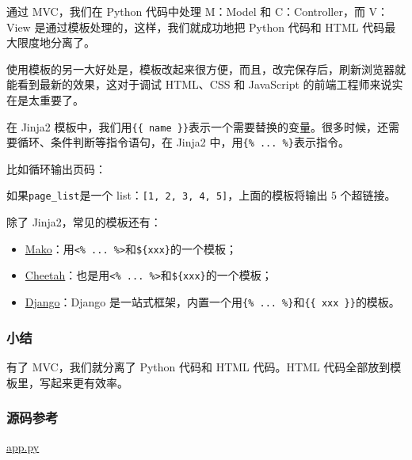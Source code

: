 通过 MVC，我们在 Python 代码中处理 M：Model 和 C：Controller，而 V：View
是通过模板处理的，这样，我们就成功地把 Python 代码和 HTML
代码最大限度地分离了。

使用模板的另一大好处是，模板改起来很方便，而且，改完保存后，刷新浏览器就能看到最新的效果，这对于调试
HTML、CSS 和 JavaScript 的前端工程师来说实在是太重要了。

在 Jinja2
模板中，我们用\texttt{\{\{\ name\ \}\}}表示一个需要替换的变量。很多时候，还需要循环、条件判断等指令语句，在
Jinja2 中，用\texttt{\{\%\ ...\ \%\}}表示指令。

比如循环输出页码：


如果\texttt{page\_list}是一个
list：\texttt{{[}1,\ 2,\ 3,\ 4,\ 5{]}}，上面的模板将输出 5 个超链接。

除了 Jinja2，常见的模板还有：

\begin{itemize}
\item
  \href{http://www.makotemplates.org/}{Mako}：用\texttt{\textless{}\%\ ...\ \%\textgreater{}}和\texttt{\$\{xxx\}}的一个模板；
\item
  \href{http://www.cheetahtemplate.org/}{Cheetah}：也是用\texttt{\textless{}\%\ ...\ \%\textgreater{}}和\texttt{\$\{xxx\}}的一个模板；
\item
  \href{https://www.djangoproject.com/}{Django}：Django
  是一站式框架，内置一个用\texttt{\{\%\ ...\ \%\}}和\texttt{\{\{\ xxx\ \}\}}的模板。
\end{itemize}

\hypertarget{ux5c0fux7ed3}{%
\subsubsection{小结}\label{ux5c0fux7ed3}}

有了 MVC，我们就分离了 Python 代码和 HTML 代码。HTML
代码全部放到模板里，写起来更有效率。

\hypertarget{ux6e90ux7801ux53c2ux8003}{%
\subsubsection{源码参考}\label{ux6e90ux7801ux53c2ux8003}}

\href{https://github.com/michaelliao/learn-python3/blob/master/samples/web/mvc/app.py}{app.py}

